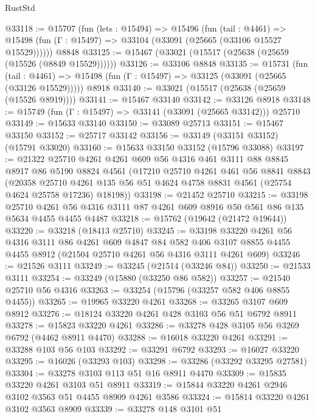 \begin{lexlean}{RustStd}
\begin{coremodule}
@33118 := @15707
    (fun (lets : @15494) =>
    @15496
      (fun (tail : @4461) =>
      @15498 (fun (Γ : @15497) => @33104 (@33091 (@25665 (@33106 @15527 @15529))))))
    @8848
@33125 := @15467 (@33021 (@15517 (@25638 (@25659 (@15526 (@8849 @15529))))))
@33126 := @33106 @8848
@33135 := @15731
    (fun (tail : @4461) => @15498 (fun (Γ : @15497) => @33125 (@33091 (@25665 (@33126 @15529)))))
    @8918
@33140 := @33021 (@15517 (@25638 (@25659 (@15526 @8919))))
@33141 := @15467 @33140
@33142 := @33126 @8918
@33148 := @15749 (fun (Γ : @15497) => @33141 (@33091 (@25665 @33142))) @25710
@33149 := @15633 @33140
@33150 := @33089 @25713
@33151 := @15467 @33150
@33152 := @25717 @33142
@33156 := @33149 (@33151 @33152) (@15791 @33020)
@33160 := @15633 @33150 @33152 (@15796 @33088)
@33197 := @21322
    @25710
    @4261
    @4261
    @609
    @56
    @4316
    @461
    @3111
    @88
    @8845
    @8917
    @86
    @5190
    @8824
    @4561
    (@17210
      @25710
      @4261
      @461
      @56
      @8841
      @8843
      (@20358
        @25710
        @4261
        @135
        @56
        @51
        @4624
        @4758
        @8831
        @4561
        (@25754 @4624 @25758 @17236)
        @18198))
@33198 := @21452 @25710
@33215 := @33198
    @25710
    @4261
    @56
    @4316
    @3111
    @87
    @4261
    @609
    @8916
    @50
    @561
    @86
    @135
    @5634
    @4455
    @4455
    @4487
@33218 := @15762 (@19642 (@21472 @19644))
@33220 := @33218 (@18413 @25710)
@33245 := @33198
    @33220
    @4261
    @56
    @4316
    @3111
    @86
    @4261
    @609
    @4847
    @84
    @582
    @406
    @3107
    @8855
    @4455
    @4455
    @8912
    (@21504 @25710 @4261 @56 @4316 @3111 @4261 @609)
@33246 := @21526 @3111
@33249 := @33245 (@21514 (@33246 @84))
@33250 := @21533 @3111
@33254 := @33249 (@15880 (@33250 @86 @582))
@33257 := @21540 @25710 @56 @4316
@33263 := @33254 (@15796 (@33257 @582 @406 @8855 @4455))
@33265 := @19965 @33220 @4261
@33268 := @33265 @3107 @609 @8912
@33276 := @18124 @33220 @4261 @428 @3103 @56 @51 @6792 @8911
@33278 := @15823 @33220 @4261
@33286 := @33278 @428 @3105 @56 @3269 @6792 (@4462 @8911 @4470)
@33288 := @16018 @33220 @4261
@33291 := @33288 @103 @56 @103
@33292 := @33291 @6792
@33293 := @16027 @33220
@33295 := @16026 (@33293 @103)
@33298 := @33286 (@33292 @33295 @27581)
@33304 := @33278 @3103 @113 @51 @16 @8911 @4470
@33309 := @15835 @33220 @4261 @3103 @51 @8911
@33319 := @15844 @33220 @4261 @2946 @3102 @3563 @51 @4455 @8909 @4261 @3586
@33324 := @15814 @33220 @4261 @3102 @3563 @8909
@33339 := @33278
    @148
    @3101
    @51

\end{coremodule}
\end{lexlean}
